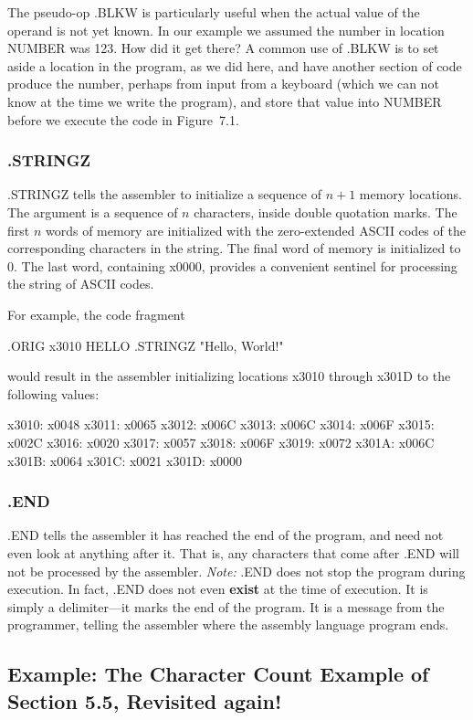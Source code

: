 \documentclass{patt}
\begin{document}
The pseudo-op .BLKW is particularly useful when the
actual value of the operand is not yet known.  In our example we assumed
the number in location NUMBER was 123.  How did it get there?  A common
use of .BLKW is to set aside a location in the program, as we did here,
and have another section of code produce the number, perhaps from input
from a keyboard (which we can not know at the time we write the program), 
and store that value into NUMBER before we execute the code in Figure~7.1.

\subsubsection{.STRINGZ}
.STRINGZ tells the assembler to initialize a sequence of $n+1$ memory
locations. The argument is a sequence of $n$ characters, inside double
quotation marks.  The first $n$ words of memory are initialized with
the zero-extended ASCII codes of the corresponding characters in the
string.  The final word of memory is initialized to 0. The last word, 
containing x0000, provides a convenient sentinel for processing the
string of ASCII codes.

For example, the code fragment
\begin{colorverbatim}
        .ORIG     x3010
HELLO   .STRINGZ  "Hello, World!"
\end{colorverbatim}
would result in the assembler initializing locations x3010 through
x301D to the following values:
\begin{colorverbatim}
x3010: x0048
x3011: x0065
x3012: x006C
x3013: x006C
x3014: x006F
x3015: x002C
x3016: x0020
x3017: x0057
x3018: x006F
x3019: x0072
x301A: x006C
x301B: x0064
x301C: x0021
x301D: x0000
\end{colorverbatim}

\subsubsection{.END}
.END tells the assembler it has reached the end of the program, and need not
even look at anything after it.  That is, any characters that
come after .END will not be processed by the assembler.  {\em Note:} .END
does not stop the program during execution.  In fact, .END does not
even {\bf exist} at the time of execution.  It is simply a delimiter---it
marks the end of the program.  It is a message from the programmer,
telling the assembler where the assembly language program ends.


\subsection{Example: The Character Count Example of Section 5.5,
  Revisited again!}
\end{document}
